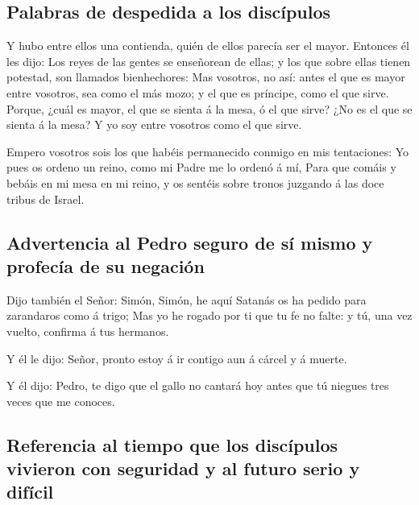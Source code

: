 \hypertarget{palabras-de-despedida-a-los-discuxedpulos}{%
\subsection{Palabras de despedida a los
discípulos}\label{palabras-de-despedida-a-los-discuxedpulos}}

 Y hubo entre ellos una contienda, quién de ellos parecía
ser el mayor.  Entonces él les dijo: Los reyes de las
gentes se enseñorean de ellas; y los que sobre ellas tienen potestad,
son llamados bienhechores:  Mas vosotros, no así: antes
el que es mayor entre vosotros, sea como el más mozo; y el que es
príncipe, como el que sirve.  Porque, ¿cuál es mayor, el
que se sienta á la mesa, ó el que sirve? ¿No es el que se sienta á la
mesa? Y yo soy entre vosotros como el que sirve.

 Empero vosotros sois los que habéis permanecido conmigo
en mis tentaciones:  Yo pues os ordeno un reino, como mi
Padre me lo ordenó á mí,  Para que comáis y bebáis en mi
mesa en mi reino, y os sentéis sobre tronos juzgando á las doce tribus
de Israel.

\hypertarget{advertencia-al-pedro-seguro-de-suxed-mismo-y-profecuxeda-de-su-negaciuxf3n}{%
\subsection{Advertencia al Pedro seguro de sí mismo y profecía de su
negación}\label{advertencia-al-pedro-seguro-de-suxed-mismo-y-profecuxeda-de-su-negaciuxf3n}}

 Dijo también el Señor: Simón, Simón, he aquí Satanás os
ha pedido para zarandaros como á trigo;  Mas yo he rogado
por ti que tu fe no falte: y tú, una vez vuelto, confirma á tus
hermanos.

 Y él le dijo: Señor, pronto estoy á ir contigo aun á
cárcel y á muerte.

 Y él dijo: Pedro, te digo que el gallo no cantará hoy
antes que tú niegues tres veces que me conoces.

\hypertarget{referencia-al-tiempo-que-los-discuxedpulos-vivieron-con-seguridad-y-al-futuro-serio-y-difuxedcil}{%
\subsection{Referencia al tiempo que los discípulos vivieron con
seguridad y al futuro serio y
difícil}\label{referencia-al-tiempo-que-los-discuxedpulos-vivieron-con-seguridad-y-al-futuro-serio-y-difuxedcil}}

